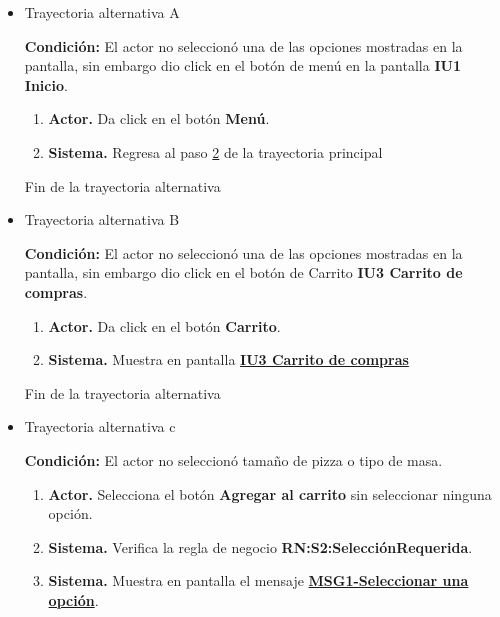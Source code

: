 	\begin{itemize}

		\item \hypertarget{CU1:TAA}{Trayectoria alternativa A}

			\noindent \textbf{Condición:} El actor no seleccionó una de las opciones mostradas en la pantalla, sin embargo dio click en el botón de menú en la pantalla \textbf{IU1 Inicio}.
			
			\begin{enumerate}
				\item \textbf{Actor.} Da click en el botón \textbf{Menú}.
				\item \textbf{Sistema.} Regresa al paso \hyperlink{CU1:TP:P2}{2} de la trayectoria principal
			\end{enumerate}
			
			Fin de la trayectoria alternativa
			
			\item \hypertarget{CU1:TAB}{Trayectoria alternativa B}
			
			\noindent \textbf{Condición:} El actor no seleccionó una de las opciones mostradas en la pantalla, sin embargo dio click en el botón de Carrito \textbf{IU3 Carrito de compras}.
			
			\begin{enumerate}
				\item \textbf{Actor.} Da click en el botón \textbf{Carrito}.
				\item \textbf{Sistema.} Muestra en pantalla \hyperlink{IU3}{\textbf{IU3 Carrito de compras}}
			\end{enumerate}
			
			Fin de la trayectoria alternativa
			
		\item \hypertarget{CU1:TAC}{Trayectoria alternativa c}
			
			\noindent \textbf{Condición:} El actor no seleccionó tamaño de pizza o tipo de masa.
			
			\begin{enumerate}
				\item \textbf{Actor.} Selecciona el botón \textbf{Agregar al carrito} sin seleccionar ninguna opción. 
				
				\item \textbf{Sistema.} Verifica la regla de negocio \textbf{RN:S2:SelecciónRequerida}.
				
				\item \textbf{Sistema.} Muestra en pantalla el mensaje \hyperlink{MSG:SeleccionarOpcion}{\textbf{MSG1-Seleccionar una opción}}. 
				

\end{enumerate}
\end{itemize}
